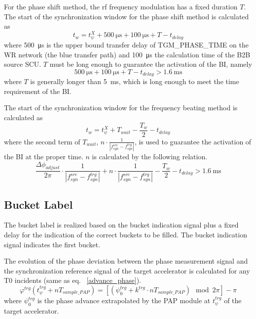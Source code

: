 For the phase shift method, the rf frequency modulation has a fixed duration $T$. The start of the synchronization window for the phase shift method is calculated as
\begin{equation}
t_\mathit{w}=t_\psi^\mathit{X}+\SI{500}{\us}+\SI{100}{\us}+T-t_\mathit{delay}\label{syn_win_start}
\end{equation}
where \SI{500}{\us} is the upper bound transfer delay of TGM\_PHASE\_TIME on the WR network (the blue transfer path) and \SI{100}{\us} the calculation time of the B2B source SCU. $T$ must be long enough to guarantee the activation of the BI, namely
\begin{equation}
\SI{500}{\us}+\SI{100}{\us}+T-t_\mathit{delay}> \SI{1.6}{\ms}
\end{equation}
where $T$ is generally longer than \SI{5}{\ms}, which is long enough to meet the time requirement of the BI. 

The start of the synchronization window for the frequency beating method is calculated as
\begin{equation}
t_\mathit{w}= t_\psi^\mathit{X}+T_\mathit{wait}-\frac{T_w}{2}-t_\mathit{delay}\label{syn_win_start1}
\end{equation}
where the second term of $T_\mathit{wait}$, $n\cdot \frac{1}{|f_{\mathit{syn}}^\mathit{src}-f_{\mathit{syn}}^\mathit{trg}|}$, is used to guarantee the activation of the BI at the proper time. $n$ is calculated by the following relation.
\begin{equation}
\frac{\Delta \phi_\mathit{adjust}}{2\pi}\cdot\frac{1}{|f_{\mathit{syn}}^\mathit{src}-f_{\mathit{syn}}^\mathit{trg}|}+n\cdot \frac{1}{|f_{\mathit{syn}}^\mathit{src}-f_{\mathit{syn}}^\mathit{trg}|}-\frac{T_w}{2}-t_\mathit{delay}> \SI{1.6}{\ms}
\end{equation}


\subsection{Bucket Label}
\label{sec:bucket_label}
The bucket label is realized based on the bucket indication signal plus a fixed delay for the indication of the correct buckets to be filled. The bucket indication signal indicates the first bucket. 

The evolution of the phase deviation between the phase measurement signal and the synchronization reference signal of the target accelerator is calculated for any T0 incidents (same as eq. ~\ref{advance_phase}).
\begin{equation}
\varphi^\mathit{trg}(t_\mathit{\psi}^\mathit{trg}+nT_\mathit{sample\_PAP})=[(\psi^\mathit{trg}_0+k^\mathit{trg}\cdot nT_\mathit{sample\_PAP}) \mod 2\pi] - \pi
\end{equation}
where $\psi^\mathit{trg}_0$ is the phase advance extrapolated by the PAP module at $t_\mathit{\psi}^\mathit{trg}$ of the target accelerator.

